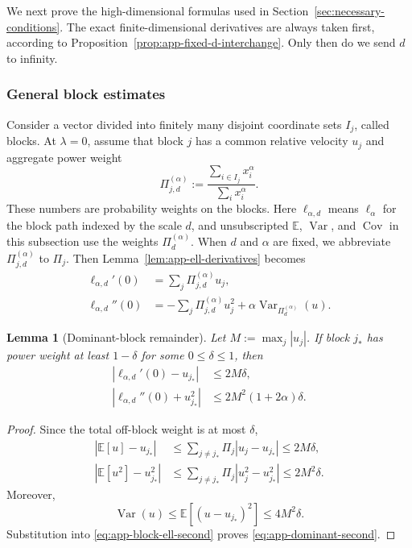 \documentclass[aps,pra,11pt,onecolumn,nofootinbib,tightenlines]{revtex4-2}
\newtheorem{lemma}[theorem]{Lemma}
\theoremstyle{definition}
\begin{document}
We next prove the high-dimensional formulas used in Section~\ref{sec:necessary-conditions}. The exact finite-dimensional derivatives are always taken first, according to Proposition~\ref{prop:app-fixed-d-interchange}. Only then do we send $d$ to infinity.

\subsubsection{General block estimates}

Consider a vector divided into finitely many disjoint coordinate sets $I_j$,
called blocks.  At $\lambda=0$, assume that block $j$ has a common relative
velocity $u_j$ and aggregate power weight
\begin{equation}
 \Pi_{j,d}^{(\alpha)}
 :=\frac{\sum_{i\in I_j}x_i^\alpha}{\sum_ix_i^\alpha}.
 \label{eq:app-aggregate-power-weight}
\end{equation}
These numbers are probability weights on the blocks.  Here
$\ell_{\alpha,d}$ means $\ell_\alpha$ for the block path indexed by the scale
$d$, and
unsubscripted $\mathbb E$, $\operatorname{Var}$, and $\operatorname{Cov}$ in
this subsection use the weights $\Pi_d^{(\alpha)}$.  When $d$ and $\alpha$ are
fixed, we abbreviate $\Pi_{j,d}^{(\alpha)}$ to $\Pi_j$.
Then Lemma~\ref{lem:app-ell-derivatives} becomes
\begin{align}
 \ell_{\alpha,d}'(0)
 &=\sum_j\Pi_{j,d}^{(\alpha)}u_j,
 \label{eq:app-block-ell-first}\\
 \ell_{\alpha,d}''(0)
 &=-\sum_j\Pi_{j,d}^{(\alpha)}u_j^2
 +\alpha\operatorname{Var}_{\Pi_d^{(\alpha)}}(u).
 \label{eq:app-block-ell-second}
\end{align}

\begin{lemma}[Dominant-block remainder]
\label{lem:app-dominant-block}
Let $M:=\max_j|u_j|$.  If block $j_*$ has power weight at least $1-\delta$ for
some $0\leq\delta\leq1$, then
\begin{align}
 \left|\ell_{\alpha,d}'(0)-u_{j_*}\right|
 &\leq2M\delta,
 \label{eq:app-dominant-first}\\
 \left|\ell_{\alpha,d}''(0)+u_{j_*}^2\right|
 &\leq2M^2(1+2\alpha)\delta.
 \label{eq:app-dominant-second}
\end{align}
\end{lemma}

\begin{proof}
Since the total off-block weight is at most $\delta$,
\begin{align}
 \left|\mathbb E[u]-u_{j_*}\right|
 &\leq\sum_{j\neq j_*}\Pi_j|u_j-u_{j_*}|
 \leq2M\delta,
 \label{eq:app-dominant-mean-proof}\\
 \left|\mathbb E[u^2]-u_{j_*}^2\right|
 &\leq\sum_{j\neq j_*}\Pi_j|u_j^2-u_{j_*}^2|
 \leq2M^2\delta.
 \label{eq:app-dominant-square-proof}
\end{align}
Moreover,
\begin{equation}
 \operatorname{Var}(u)
 \leq\mathbb E[(u-u_{j_*})^2]
 \leq4M^2\delta.
 \label{eq:app-dominant-var-proof}
\end{equation}
Substitution into \eqref{eq:app-block-ell-second} proves \eqref{eq:app-dominant-second}.
\end{proof}
\end{document}

